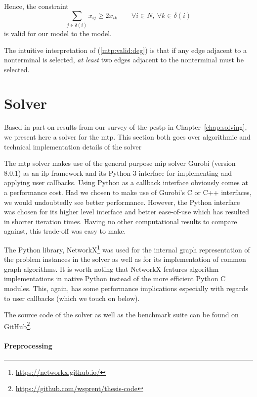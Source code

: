  Hence, the constraint
 \begin{equation}\label{mtp:valid:deg}
   \sum_{j \in \delta(i)}x_{ij} \geq 2 x_{ik} \qquad \forall i \in N, \: \forall k \in \delta(i)
 \end{equation}
 is valid for our model to the model.

 The intuitive interpretation of (\ref{mtp:valid:deg}) is that if any edge adjacent to
 a nonterminal is selected, \textit{at least} two edges adjacent to the nonterminal must be selected.
\section{Solver}\label{sec:mtp:solver}
Based in part on results from our survey of the \gls{pcstp} in Chapter~\ref{chap:solving},
we present here
a solver for the \gls{mtp}. This section both goes over algorithmic and technical
implementation details of the solver

The \gls{mtp} solver makes use of the general purpose \gls{mip} solver
Gurobi \citep{gurobi} (version 8.0.1) as an \gls{ilp} framework
and its Python 3 interface for implementing and applying user callbacks.
Using Python as a callback interface obviously comes at a performance cost.
Had we chosen to make use of Gurobi's C or C++ interfaces,
we would undoubtedly see better performance.
However, the Python interface was chosen for its higher level interface
and better ease-of-use which has resulted in shorter iteration times.
Having no other computational results
to compare against, this trade-off was easy to make.

The Python library,
NetworkX\footnote{\url{https://networkx.github.io/}} \citep{hagberg2008exploring}
was used for the internal graph representation of the
problem instances in the solver as well as for its implementation of common
graph algorithms.
It is worth noting that NetworkX features algorithm implementations
in native Python instead of the more efficient Python C modules. This, again, has some
performance implications especially with regards to user callbacks (which we
 touch on below).

The source code of the solver as well as the benchmark suite
can be found on GitHub\footnote{\url{https://github.com/wsprent/thesis-code}}.

\paragraph{Preprocessing}

